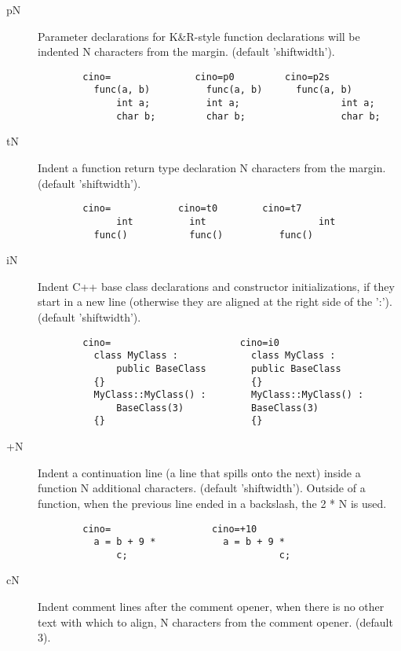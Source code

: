 \begin{description}
\begin{verbatim}
 \end{verbatim}
    \item[pN] Parameter declarations for K\&R-style function declarations will
          be indented N characters from the margin.  (default
          'shiftwidth').
\begin{verbatim}
        cino=               cino=p0         cino=p2s
          func(a, b)          func(a, b)      func(a, b)
              int a;          int a;                  int a;
              char b;         char b;                 char b;
 \end{verbatim}
    \item[tN] Indent a function return type declaration N characters from the
          margin.  (default 'shiftwidth').
\begin{verbatim}
        cino=            cino=t0        cino=t7
              int          int                    int
          func()           func()          func()
 \end{verbatim}
    \item[iN] Indent C++ base class declarations and constructor
          initializations, if they start in a new line (otherwise they
          are aligned at the right side of the ':').
          (default 'shiftwidth').
\begin{verbatim}
        cino=                       cino=i0
          class MyClass :             class MyClass :
              public BaseClass        public BaseClass
          {}                          {}
          MyClass::MyClass() :        MyClass::MyClass() :
              BaseClass(3)            BaseClass(3)
          {}                          {}
 \end{verbatim}
 \clearpage
    \item[+N] Indent a continuation line (a line that spills onto the next)
              inside a function N additional characters.  (default
              'shiftwidth').
              Outside of a function, when the previous line ended in a
              backslash, the 2 * N is used.
\begin{verbatim}
        cino=                  cino=+10
          a = b + 9 *            a = b + 9 *
              c;                           c;
 \end{verbatim}
    \item[cN] Indent comment lines after the comment opener, when there is no
          other text with which to align, N characters from the comment
          opener.  (default 3).
\begin{verbatim}

\end{verbatim}
\end{description}
